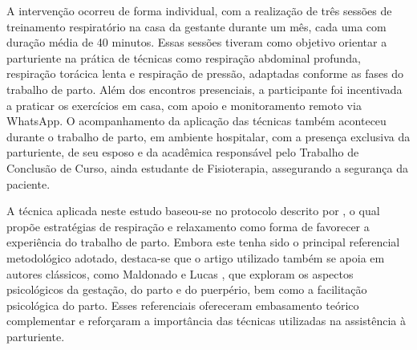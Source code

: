 \documentclass[openright]{tex/estilos/normas-utf-tex}
\begin{document}

A intervenção ocorreu de forma individual, com a realização de três sessões de treinamento respiratório na casa da gestante durante um mês, cada uma com duração média de 40 minutos. Essas sessões tiveram como objetivo orientar a parturiente na prática de técnicas como respiração abdominal profunda, respiração torácica lenta e respiração de pressão, adaptadas conforme as fases do trabalho de parto. Além dos encontros presenciais, a participante foi incentivada a praticar os exercícios em casa, com apoio e monitoramento remoto via WhatsApp. O acompanhamento da aplicação das técnicas também aconteceu durante o trabalho de parto, em ambiente hospitalar, com a presença exclusiva da parturiente, de seu esposo e da acadêmica responsável pelo Trabalho de Conclusão de Curso, ainda estudante de Fisioterapia, assegurando a segurança da paciente.

A técnica aplicada neste estudo baseou-se no protocolo descrito por , o qual propõe estratégias de respiração e relaxamento como forma de favorecer a experiência do trabalho de parto. Embora este tenha sido o principal referencial metodológico adotado, destaca-se que o artigo utilizado também se apoia em autores clássicos, como Maldonado \citeyear{maldonado1991} e Lucas \citeyear{lucas1983}, que exploram os aspectos psicológicos da gestação, do parto e do puerpério, bem como a facilitação psicológica do parto. Esses referenciais ofereceram embasamento teórico complementar e reforçaram a importância das técnicas utilizadas na assistência à parturiente.


\end{document}
